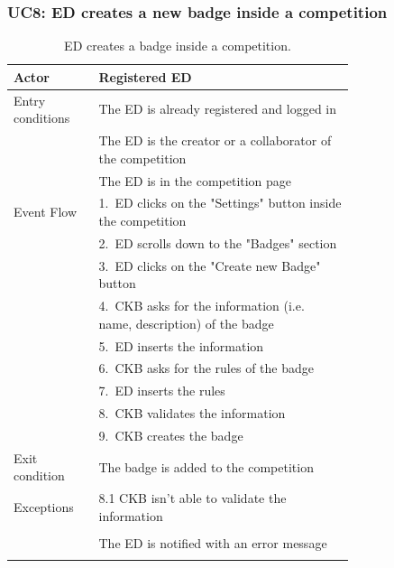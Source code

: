 \subsubsection*{UC8: ED creates a new badge inside a competition}
\begin{center}
  \begin{longtable}{l|p{0.75\linewidth}}
    \hline
    Actor & Registered ED \\
    \hline
    Entry conditions & The ED is already registered and logged in  \\
    & The ED is the creator or a collaborator of the competition \\
    & The ED is in the competition page \\
    \hline
    Event Flow & 1.\ ED clicks on the "Settings" button inside the competition\\
    & 2.\ ED scrolls down to the "Badges" section \\
    & 3.\ ED clicks on the "Create new Badge" button \\
    & 4.\ CKB asks for the information (i.e. name, description) of the badge \\
    & 5.\ ED inserts the information \\
    & 6.\ CKB asks for the rules of the badge \\
    & 7.\ ED inserts the rules \\
    & 8.\ CKB validates the information \\
    & 9.\ CKB creates the badge \\
    \hline
    Exit condition &  The badge is added to the competition \\
    \hline
    Exceptions & 8.1 CKB isn’t able to validate the information \\ \\
    & The ED is notified with an error message \\
    \hline
    \caption{ED creates a badge inside a competition.}
    \label{tab: ED_create_badge}
  \end{longtable}


\end{center}
